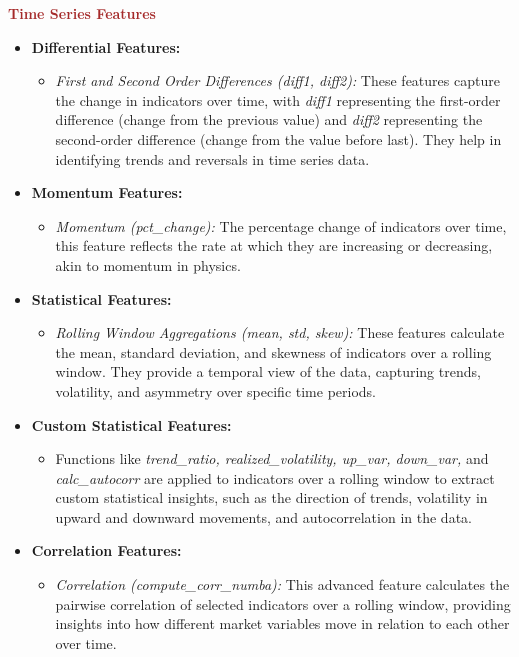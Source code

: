 \documentclass[12pt]{article}
\newtheorem{Proof of Lemma}{Proof of Lemma}
\begin{document}
\noindent \textcolor{brown}{\textbf{Time Series Features}}
\begin{itemize}
  \item \textbf{Differential Features:}
  \begin{itemize}
  \item \textit{First and Second Order Differences (diff1, diff2):} These features capture the change in indicators over time, with \textit{diff1} representing the first-order difference (change from the previous value) and \textit{diff2} representing the second-order difference (change from the value before last). They help in identifying trends and reversals in time series data.
  \end{itemize}
  
  \item \textbf{Momentum Features:}
  \begin{itemize}
  \item \textit{Momentum (pct\_change):} The percentage change of indicators over time, this feature reflects the rate at which they are increasing or decreasing, akin to momentum in physics.
  \end{itemize}
  
  \item \textbf{Statistical Features:}
  \begin{itemize}
  \item \textit{Rolling Window Aggregations (mean, std, skew):} These features calculate the mean, standard deviation, and skewness of indicators over a rolling window. They provide a temporal view of the data, capturing trends, volatility, and asymmetry over specific time periods.
  \end{itemize}
  
  \item \textbf{Custom Statistical Features:}
  \begin{itemize}
  \item Functions like \textit{trend\_ratio, realized\_volatility, up\_var, down\_var,} and \newline \textit{calc\_autocorr} are applied to indicators over a rolling window to extract custom statistical insights, such as the direction of trends, volatility in upward and downward movements, and autocorrelation in the data.
  \end{itemize}
  
  \item \textbf{Correlation Features:}
  \begin{itemize}
  \item \textit{Correlation (compute\_corr\_numba):} This advanced feature calculates the pairwise correlation of selected indicators over a rolling window, providing insights into how different market variables move in relation to each other over time.
  \end{itemize}
  
\end{itemize}
\end{document}
